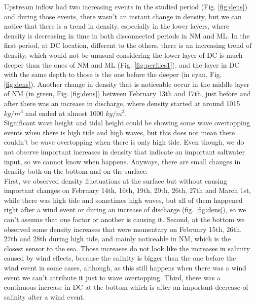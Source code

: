 \documentclass[tesis.tex]{subfiles}
\begin{document}
Upstream inflow had two increasing events in the studied period (Fig. \ref{fig:dens}) and during those events, there wasn't an instant change in density, but we can notice that there is a trend in density, especially in the lower layers, where density is decreasing in time in both disconnected periods in NM and ML. In the first period, at DC location, different to the others, there is an increasing trend of density, which would not be unusual considering the lower layer of DC is much deeper than the ones of NM and ML (Fig. \ref{fig:perfiles1}), and the layer in DC with the same depth to those is the one before the deeper (in cyan, Fig. \ref{fig:dens}). Another change in density that is noticeable occur in the middle layer of NM (in green, Fig. \ref{fig:dens}) between February 13th and 17th, just before and after there was an increase in discharge, where density started at around 1015 $kg/m^3$ and ended at almost 1000 $kg/m^3$. \\

Significant wave height and tidal height could be showing some wave overtopping events when there is high tide and high waves, but this does not mean there couldn't be wave overtopping when there is only high tide. Even though, we do not observe important increases in density that indicate an important saltwater input, so we cannot know when happens. Anyways, there are small changes in density both on the bottom and on the surface.\\

First, we observed density fluctuations at the surface but without causing important changes on February 14th, 16th, 19th, 20th, 26th, 27th and March 1st, while there was high tide and sometimes high waves, but all of them happened right after a wind event or during an increase of discharge (fig. \ref{fig:dens}), so we can't assume that one factor or another is causing it. Second, at the bottom we observed some density increases that were momentary on February 15th, 26th, 27th and 28th during high tide, and mainly noticeable in NM, which is the closest sensor to the sea. Those increases do not look like the increases in salinity caused by wind effects, because the salinity is bigger than the one before the wind event in some cases, although, as this still happens when there was a wind event we can't attribute it just to wave overtopping. Third, there was a continuous increase in DC at the bottom which is after an important decrease of salinity after a wind event.\\
\end{document}
